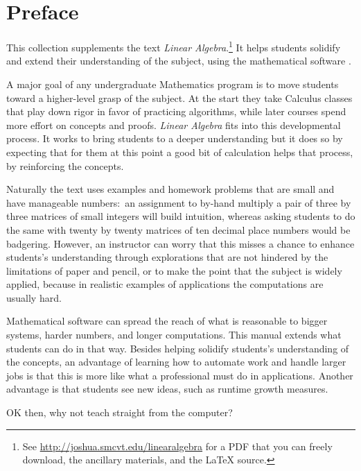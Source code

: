 \chapter*{Preface}\pagestyle{preface}\thispagestyle{preface}
\setlength{\parskip}{.25ex}


This collection supplements the text \nocite{Hefferon12}
\textit{Linear Algebra}.\footnote{See 
\protect\url{http://joshua.smcvt.edu/linearalgebra}
for a PDF that you can freely download, the ancillary materials, and
the \protect\LaTeX{} source.}
It helps students
solidify and extend their understanding of the subject, 
using the mathematical software \Sage{}.%

A major goal of any undergraduate Mathematics program is to move students 
toward a higher-level grasp of the subject.
At the start they take Calculus classes that play down 
rigor in favor of practicing algorithms, while
later courses spend more effort on concepts and proofs.
\textit{Linear Algebra} fits into this developmental process.
It works to bring students to a deeper understanding 
but it does so by expecting
that for them at this point a good bit of calculation helps that process,
by reinforcing the concepts. 

Naturally the text uses examples and homework problems
that are small and have manageable numbers:~an 
assignment to by-hand multiply a pair of three by three matrices
of small integers will build intuition, whereas asking students to do the same
with twenty by twenty matrices
of ten decimal place numbers would be badgering. 
However, an instructor can worry that this misses a chance
to enhance students's understanding through explorations that are not 
hindered by the limitations of paper and pencil,
or to make the point that the subject is widely applied, because in 
realistic examples of 
applications the computations are usually hard. 

Mathematical software can spread the reach of
what is reasonable 
to bigger systems, harder numbers, and longer computations.
This manual extends what students can do in that way.
Besides helping solidify students's understanding of the concepts,
an advantage of learning how to automate work and
handle larger jobs is that 
this is more like what a professional must do in applications.
Another advantage is that students see new ideas, such as 
runtime growth measures.

OK then, why 
not teach straight from the computer?

